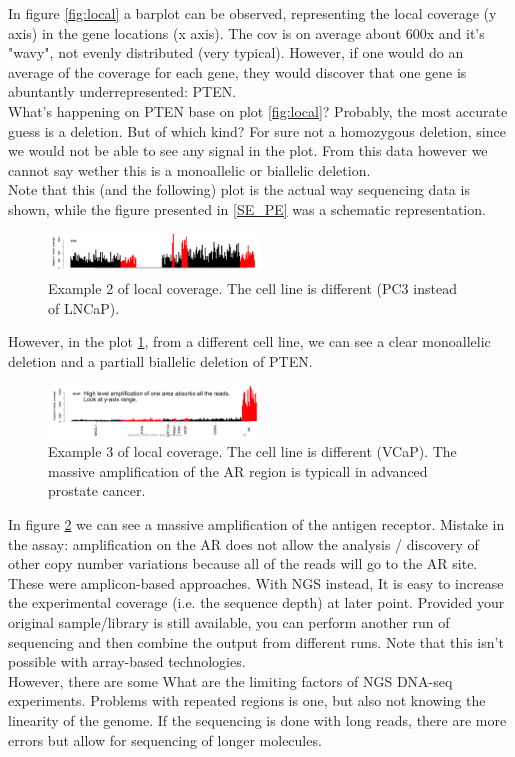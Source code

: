 In figure \ref{fig:local} a barplot can be observed, representing the local coverage (y axis) in the gene locations (x axis). The cov is on average about 600x and it's "wavy", not evenly distributed (very typical). However, if one would do an average of the coverage for each gene, they would discover that one gene is abuntantly underrepresented: PTEN.\\
What's happening on PTEN base on plot \ref{fig:local}? Probably, the most accurate guess is a deletion. But of which kind? For sure not a homozygous deletion, since we would not be able to see any signal in the plot. From this data however we cannot say wether this is a monoallelic or biallelic deletion. \\
Note that this (and the following) plot is the actual way sequencing data is shown, while the figure presented in \ref{SE_PE} was a schematic representation. 

\begin{figure}[htbp!]
    \centering
    \includegraphics[width=0.5\textwidth]{local_coverage1.png}
    \caption{Example 2 of local coverage. The  cell line is different (PC3 instead of LNCaP). }
    \label{fig:local1}
\end{figure}

However, in the plot \ref{fig:local1}, from a different cell line, we can see a clear monoallelic deletion and a partiall biallelic deletion of PTEN.\\

\begin{figure}[htbp!]
    \centering
    \includegraphics[width=0.5\textwidth]{local_coverage2.png}
    \caption{Example 3 of local coverage. The  cell line is different (VCaP). The massive amplification of the AR region is typicall in advanced prostate cancer.}
    \label{fig:local2}
\end{figure}

In figure \ref{fig:local2} we can see a massive amplification of the antigen receptor. Mistake in the assay: amplification on the AR does not allow the analysis / discovery of other copy number variations because all of the reads will go to the AR site. \\
These were amplicon-based approaches. 
With NGS instead, It is easy to increase the experimental coverage (i.e. the sequence depth) at later point. 
Provided your original sample/library is still available, you can perform another run of sequencing and then combine the output from different runs. 
Note that this isn’t possible with array-based technologies.\\
However, there are some What are the limiting factors of NGS DNA-seq experiments. Problems with repeated regions is one, but also not knowing the linearity of the genome. If the sequencing is done with long reads, there are more errors but allow for sequencing of longer molecules. 


